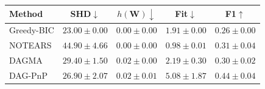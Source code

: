 \begin{tabular}{lcccc}
\toprule
Method & SHD$\downarrow$ & $h(\mathbf{W})\downarrow$ & Fit$\downarrow$ & F1$\uparrow$ \\
\midrule
Greedy-BIC & $23.00\pm0.00$ & $0.00\pm0.00$ & $1.91\pm0.00$ & $0.26\pm0.00$ \\
NOTEARS & $44.90\pm4.66$ & $0.00\pm0.00$ & $0.98\pm0.01$ & $0.31\pm0.04$ \\
DAGMA & $29.40\pm1.50$ & $0.02\pm0.00$ & $2.19\pm0.30$ & $0.30\pm0.02$ \\
DAG-PnP & $26.90\pm2.07$ & $0.02\pm0.01$ & $5.08\pm1.87$ & $0.44\pm0.04$ \\
\bottomrule
\end{tabular}